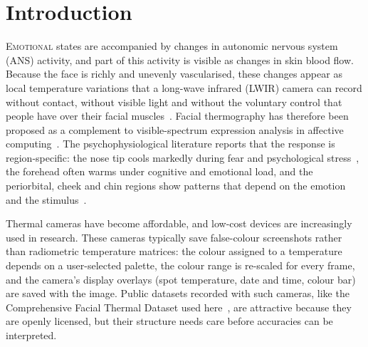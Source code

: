 \documentclass[10pt,twocolumn,letterpaper]{article}
\begin{document}
\section{Introduction}

\textsc{Emotional} states are accompanied by changes in autonomic nervous system (ANS) activity, and part of this activity is visible as changes in skin blood flow. Because the face is richly and unevenly vascularised, these changes appear as local temperature variations that a long-wave infrared (LWIR) camera can record without contact, without visible light and without the voluntary control that people have over their facial muscles~\cite{ioannou2014}. Facial thermography has therefore been proposed as a complement to visible-spectrum expression analysis in affective computing~\cite{corneanu2016}. The psychophysiological literature reports that the response is region-specific: the nose tip cools markedly during fear and psychological stress~\cite{levine2001,engert2014}, the forehead often warms under cognitive and emotional load, and the periorbital, cheek and chin regions show patterns that depend on the emotion and the stimulus~\cite{ioannou2014,kosonogov2017}.

Thermal cameras have become affordable, and low-cost devices are increasingly used in research. These cameras typically save false-colour screenshots rather than radiometric temperature matrices: the colour assigned to a temperature depends on a user-selected palette, the colour range is re-scaled for every frame, and the camera's display overlays (spot temperature, date and time, colour bar) are saved with the image. Public datasets recorded with such cameras, like the Comprehensive Facial Thermal Dataset used here~\cite{dataset,abuhussein2024}, are attractive because they are openly licensed, but their structure needs care before accuracies can be interpreted.
\end{document}
